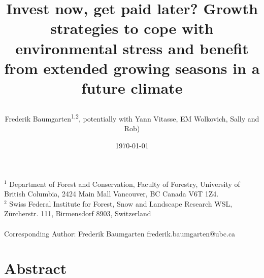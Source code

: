 \documentclass{article}
\begin{document}
	
	
	\title{Invest now, get paid later? Growth strategies to cope with environmental stress and benefit from extended growing seasons in a future climate %
		
		
	} 
	
	\date{\today}
	\author{Frederik Baumgarten\textsuperscript{1,2}, potentially with Yann Vitasse, EM Wolkovich, Sally and Rob)}
	\maketitle
	
	$^1$ Department of Forest and Conservation, Faculty of Forestry, University of British Columbia, 2424 Main Mall
	Vancouver, BC Canada V6T 1Z4. \\
	
	
	
	$^2$  Swiss Federal Institute for Forest, Snow and Landscape Research WSL, Zürcherstr. 111, Birmensdorf 8903, Switzerland\\ \\
	
	Corresponding Author: Frederik Baumgarten frederik.baumgarten@ubc.ca \\
	
	
	
	\newpage
	
	\section*{Abstract} %
	
\end{document}

